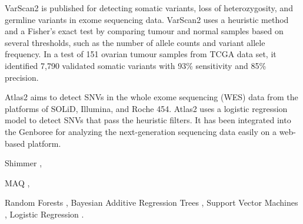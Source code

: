 \documentclass[11pt,reqno]{amsart}
\begin{document}
VarScan2 \citep{Koboldt2012} is published for detecting somatic variants, loss of heterozygosity, and germline variants in exome sequencing data.
VarScan2 uses a heuristic method and a Fisher's exact test by comparing tumour and normal samples based on several thresholds, such as the number of allele counts and variant allele frequency.
In a test of 151 ovarian tumour samples from TCGA data set, it identified 7,790 validated somatic variants with 93\% sensitivity and 85\% precision.

Atlas2 \citep{challis2012integrative} aims to detect SNVs in the whole exome sequencing (WES) data from the platforms of SOLiD, Illumina, and Roche 454.
Atlas2 uses a logistic regression model to detect SNVs that pass the heuristic filters.
It has been integrated into the Genboree for analyzing the next-generation sequencing data easily on a web-based platform.

Shimmer \citep{Hansen2013},

MAQ \citep{Li2008},

Random Forests \citep{Ding2012},
Bayesian Additive Regression Trees \citep{Ding2012},
Support Vector Machines \citep{Ding2012},
Logistic Regression \citep{Ding2012}.




\end{document}
